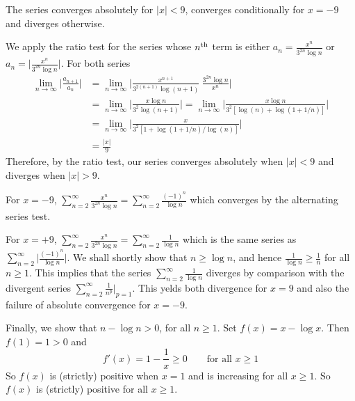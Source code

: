 \begin{answer}
The series converges absolutely for $|x|<9$, converges conditionally
for $x=-9$ and diverges otherwise.
\end{answer}

\begin{solution}
We apply the ratio test for the series whose $n^{\rm th}$
term is either $a_n=\frac{x^n}{3^{2n}\log n}$
or $a_n=\big|\frac{x^n}{3^{2n}\log n}\big|$. For both series
\begin{align*}
\lim_{n\to\infty} \bigg| \frac{ a_{n+1} }{ a_n } \bigg|
&= \lim_{n\to\infty} \bigg| \frac{x^{n+1}}{3^{2(n+1)}\log(n+1)} \
                               \frac{3^{2n}\log n}{x^n} \bigg| \\
&= \lim_{n\to\infty} \bigg| \frac{x\log n}{3^2\log(n+1)} \bigg|
=\lim_{n\to\infty} \bigg| \frac{x\log n}{3^2[\log(n)+\log(1+1/n)]} \bigg| \\
&=\lim_{n\to\infty} \bigg| \frac{x}{3^2[1+\log(1+1/n)/\log(n)]} \bigg| \\
&=\frac{|x|}{9}
\end{align*}
Therefore, by the ratio test, our series converges absolutely when
$|x|<9$ and diverges when $|x|>9$.

For $x=-9$, $\displaystyle\sum_{n=2}^\infty\frac{x^n}{3^{2n}\log n}
=\sum_{n=2}^\infty\frac{(-1)^n}{\log n}$ which converges by
the alternating series test.

For $x=+9$, $\displaystyle\sum_{n=2}^\infty\frac{x^n}{3^{2n}\log n}
=\sum_{n=2}^\infty\frac{1}{\log n}$ which is the same series
as $\displaystyle\sum_{n=2}^\infty\Big|\frac{(-1)^n}{\log n}\Big|$.
We shall shortly
show that $n\ge\log n$, and hence $\frac{1}{\log n}\ge \frac{1}{n}$
for all $n\ge 1$.
This implies that the series $\displaystyle\sum_{n=2}^\infty\frac{1}{\log n}$
diverges by comparison with the divergent series
$\displaystyle\sum_{n=2}^\infty\frac{1}{n^p}\bigg|_{p=1}$.
This yelds both divergence for $x=9$ and
also the failure of absolute convergence for $x=-9$.

Finally, we show that $n-\log n > 0$, for all $n\ge 1$.
Set $f(x)=x-\log x$. Then $f(1)=1>0$ and
\begin{equation*}
f'(x) = 1 -\frac{1}{x} \ge 0\qquad\text{for all }x\ge 1
\end{equation*}
So $f(x)$ is (strictly) positive when $x=1$ and is increasing for all
$x\ge 1$. So $f(x)$ is (strictly) positive for all $x\ge 1$.


\end{solution}




